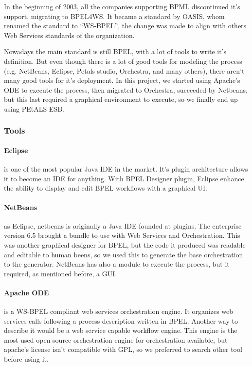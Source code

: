 In the beginning of 2003, all the companies supporting BPML discontinued it's support, migrating to BPEL4WS. It became a standard by OASIS, whom renamed the standard to ``WS-BPEL'', the change was made to align with others Web Services standards of the organization. \citep{OASIS}

Nowadays the main standard is still BPEL, with a lot of tools to write it's definition. But even though there is a lot of good tools for modeling the process (e.g. NetBeans, Eclipse, Petals studio, Orchestra, and many others), there aren't many good tools for it's deployment. In this project, we started using Apache's ODE to execute the process, then migrated to Orchestra, succeeded by Netbeans, but this last required a graphical environment to execute, so we finally end up using PEtALS ESB. 

\subsubsection{Tools}

\paragraph{Eclipse}
is one of the most popular Java IDE in the market. It's plugin architecture allows it to become an IDE for anything. With BPEL Designer plugin, Eclipse enhance the ability to display and edit BPEL workflows with a graphical UI.

\paragraph{NetBeans}
as Eclipse, netbeans is originally a Java IDE founded at plugins. The enterprise version 6.5 brought a bundle to use with Web Services and Orchestration. This was another graphical designer for BPEL, but the code it produced was readable and editable to human beens, so we used this to generate the base orchestration to the generator. NetBeans has also a module to execute the process, but it required, as mentioned before, a GUI.

\paragraph{Apache ODE}
is a WS-BPEL compliant web services orchestration engine. It organizes web services calls following a process description written in BPEL. Another way to describe it would be a web service capable workflow engine. This engine is the most used open source orchestration engine for orchestration available, but apache's license isn't compatible with GPL, so we preferred to search other tool before using it.


